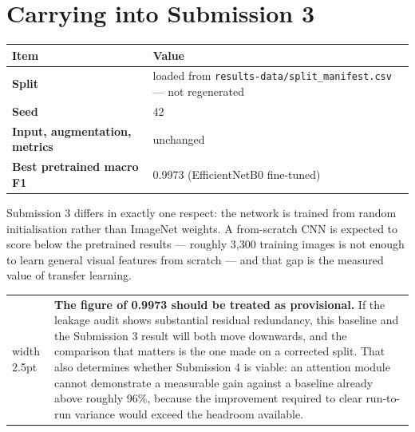 \documentclass[11pt,a4paper]{article}
\makeatletter
\newenvironment{keybox}
  {\par\medskip\noindent\begin{tabular}{@{}p{0.3em}@{\hspace{0.8em}}p{\dimexpr\linewidth-2.2em}@{}}
   {\color{black}\vrule width 2.5pt} &}
  {\end{tabular}\par\medskip}
\makeatother
\begin{document}
\section{Carrying into Submission 3}

\begin{tabularx}{\linewidth}{@{}>{\bfseries}p{5.0cm}X@{}}
\toprule
Item & Value \\
\midrule
Split & loaded from \texttt{results-data/split\_manifest.csv} --- not regenerated \\
Seed & 42 \\
Input, augmentation, metrics & unchanged \\
Best pretrained macro F1 & 0.9973 (EfficientNetB0 fine-tuned) \\
\bottomrule
\end{tabularx}

Submission 3 differs in exactly one respect: the network is trained from random
initialisation rather than ImageNet weights. A from-scratch CNN is expected to score
below the pretrained results --- roughly 3{,}300 training images is not enough to learn
general visual features from scratch --- and that gap is the measured value of transfer
learning.

\begin{keybox}
\textbf{The figure of 0.9973 should be treated as provisional.} If the leakage audit
shows substantial residual redundancy, this baseline and the Submission 3 result will
both move downwards, and the comparison that matters is the one made on a corrected
split. That also determines whether Submission 4 is viable: an attention module cannot
demonstrate a measurable gain against a baseline already above roughly 96\%, because the
improvement required to clear run-to-run variance would exceed the headroom available.
\end{keybox}
\end{document}
